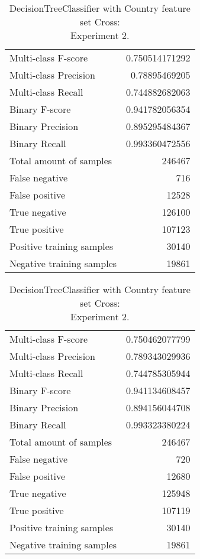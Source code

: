 \begin{table}[H]
\begin{minipage}{0.5\textwidth}
\caption{DecisionTreeClassifier with Country feature set Cross: \\Experiment 1.}
\centering
\begin{tabular}{l r}
\toprule
Multi-class F-score & 0.750514171292 \\
Multi-class Precision & 0.78895469205 \\
Multi-class Recall & 0.744882682063 \\
\midrule
Binary F-score & 0.941782056354 \\
Binary Precision & 0.895295484367 \\
Binary Recall & 0.993360472556 \\
\midrule
Total amount of samples & 246467 \\
False negative & 716 \\
False positive & 12528 \\
True negative & 126100 \\
True positive & 107123 \\
\midrule
Positive training samples & 30140 \\
Negative training samples & 19861 \\
\bottomrule
\end{tabular}

\end{minipage}
\hfillx
\begin{minipage}{0.5\textwidth}
\caption{DecisionTreeClassifier with Country feature set Cross: \\Experiment 2.}
\centering
\begin{tabular}{l r}
\toprule
Multi-class F-score & 0.750462077799 \\
Multi-class Precision & 0.789343029936 \\
Multi-class Recall & 0.744785305944 \\
\midrule
Binary F-score & 0.941134608457 \\
Binary Precision & 0.894156044708 \\
Binary Recall & 0.993323380224 \\
\midrule
Total amount of samples & 246467 \\
False negative & 720 \\
False positive & 12680 \\
True negative & 125948 \\
True positive & 107119 \\
\midrule
Positive training samples & 30140 \\
Negative training samples & 19861 \\
\bottomrule
\end{tabular}
\end{minipage}
\end{table}

